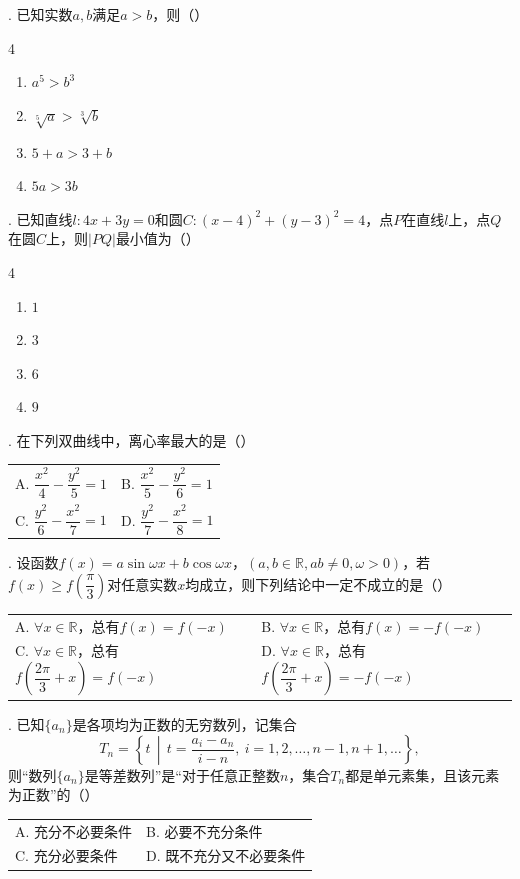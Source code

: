 . 已知实数$a,b$满足$a>b$，则（\quad）
\begin{multicols}{4}
\begin{enumerate}[label=\Alph*.,leftmargin=*]
  \item $a^5>b^3$
  \item $\sqrt[5]{a}>\sqrt[3]{b}$
  \item $5+a>3+b$
  \item $5a>3b$
\end{enumerate}
\end{multicols}

. 已知直线$l:4x+3y=0$和圆$C:(x-4)^2+(y-3)^2=4$，点$P$在直线$l$上，点$Q$在圆$C$上，则$|PQ|$最小值为（\quad）
\begin{multicols}{4}
\begin{enumerate}[label=\Alph*.,leftmargin=*]
  \item $1$
  \item $3$
  \item $6$
  \item $9$
\end{enumerate}
\end{multicols}

. 在下列双曲线中，离心率最大的是（\quad）
\begin{center}
\begin{tabular}{@{}p{}p{}@{}}
A. $\dfrac{x^2}{4}-\dfrac{y^2}{5}=1$
  & B. $\dfrac{x^2}{5}-\dfrac{y^2}{6}=1$ \\
C. $\dfrac{y^2}{6}-\dfrac{x^2}{7}=1$
  & D. $\dfrac{y^2}{7}-\dfrac{x^2}{8}=1$
\end{tabular}
\end{center}

. 设函数$f(x)=a\sin\omega x+b\cos\omega x$，$(a,b\in\mathbb{R},ab\neq0,\omega>0)$，若$f(x)\geqslant f\!\left(\dfrac{\pi}{3}\right)$对任意实数$x$均成立，则下列结论中一定不成立的是（\quad）
\begin{center}
\begin{tabular}{@{}p{}p{}@{}}
A. $\forall x\in\mathbb{R}$，总有$f(x)=f(-x)$
  & B. $\forall x\in\mathbb{R}$，总有$f(x)=-f(-x)$ \\
C. $\forall x\in\mathbb{R}$，总有$f\!\left(\dfrac{2\pi}{3}+x\right)=f(-x)$
  & D. $\forall x\in\mathbb{R}$，总有$f\!\left(\dfrac{2\pi}{3}+x\right)=-f(-x)$
\end{tabular}
\end{center}

. 已知$\{a_n\}$是各项均为正数的无穷数列，记集合
\[
T_n=\left\{t\,\middle|\,t=\frac{a_i-a_n}{i-n},\ i=1,2,\ldots,n-1,n+1,\ldots\right\},
\]
则“数列$\{a_n\}$是等差数列”是“对于任意正整数$n$，集合$T_n$都是单元素集，且该元素为正数”的（\quad）
\begin{center}
\begin{tabular}{@{}p{}p{}@{}}
A. 充分不必要条件 & B. 必要不充分条件 \\
C. 充分必要条件   & D. 既不充分又不必要条件
\end{tabular}
\end{center}

